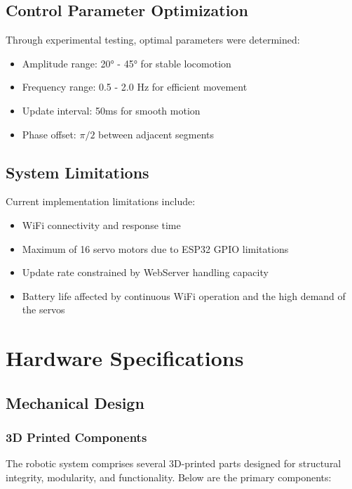 \documentclass[12pt,a4paper]{report}
\begin{document}
\section{Control Parameter Optimization}
Through experimental testing, optimal parameters were determined:
\begin{itemize}
    \item Amplitude range: 20° - 45° for stable locomotion
    \item Frequency range: 0.5 - 2.0 Hz for efficient movement
    \item Update interval: 50ms for smooth motion
    \item Phase offset: $\pi/2$ between adjacent segments
\end{itemize}

\section{System Limitations}
Current implementation limitations include:
\begin{itemize}
    \item WiFi connectivity and response time
    \item Maximum of 16 servo motors due to ESP32 GPIO limitations
    \item Update rate constrained by WebServer handling capacity
    \item Battery life affected by continuous WiFi operation and the high demand of the servos
\end{itemize}

\appendix
\chapter{Hardware Specifications}
\section{Mechanical Design}
\subsection{3D Printed Components}
The robotic system comprises several 3D-printed parts designed for structural integrity, modularity, and functionality. Below are the primary components:
\FloatBarrier
\end{document}
